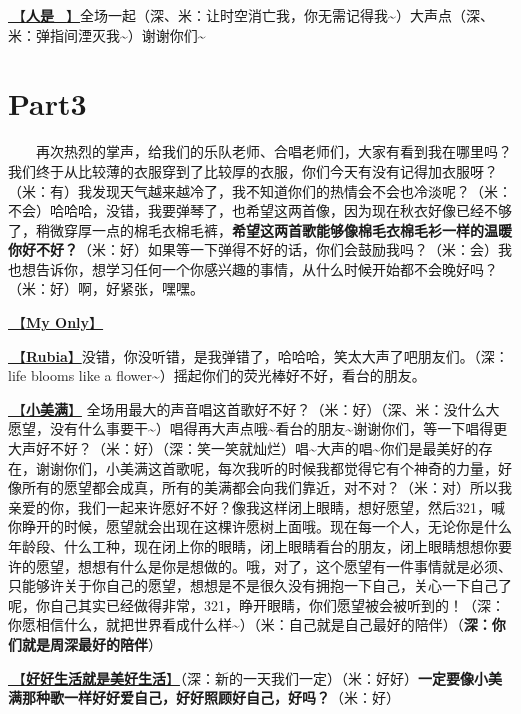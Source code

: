\documentclass[]{ctexbook}
\begin{document}
\hyperref[renshi]{🎵【\textbf{人是\_}】}全场一起（深、米：让时空消亡我，你无需记得我\textasciitilde）大声点（深、米：弹指间湮灭我\textasciitilde）谢谢你们\textasciitilde{}

\section{Part3}\label{suzhou-20241109-part3}

  再次热烈的掌声，给我们的乐队老师、合唱老师们，大家有看到我在哪里吗？我们终于从比较薄的衣服穿到了比较厚的衣服，你们今天有没有记得加衣服呀？（米：有）我发现天气越来越冷了，我不知道你们的热情会不会也冷淡呢？（米：不会）哈哈哈，没错，我要弹琴了，也希望这两首像，因为现在秋衣好像已经不够了，稍微穿厚一点的棉毛衣棉毛裤，\textbf{希望这两首歌能够像棉毛衣棉毛衫一样的温暖你好不好？}（米：好）如果等一下弹得不好的话，你们会鼓励我吗？（米：会）我也想告诉你，想学习任何一个你感兴趣的事情，从什么时候开始都不会晚好吗？（米：好）啊，好紧张，嘿嘿。

\hyperref[my-only]{🎵【\textbf{My Only}】}

\hyperref[rubia]{🎵【\textbf{Rubia}】}没错，你没听错，是我弹错了，哈哈哈，笑太大声了吧朋友们。（深：life blooms like a flower\textasciitilde）摇起你们的荧光棒好不好，看台的朋友。

\hyperref[happy-ending]{🎵【\textbf{小美满}】} 全场用最大的声音唱这首歌好不好？（米：好）（深、米：没什么大愿望，没有什么事要干\textasciitilde）唱得再大声点哦\textasciitilde 看台的朋友\textasciitilde 谢谢你们，等一下唱得更大声好不好？（米：好）（深：笑一笑就灿烂）唱\textasciitilde 大声的唱\textasciitilde 你们是最美好的存在，谢谢你们，小美满这首歌呢，每次我听的时候我都觉得它有个神奇的力量，好像所有的愿望都会成真，所有的美满都会向我们靠近，对不对？（米：对）所以我亲爱的你，我们一起来许愿好不好？像我这样闭上眼睛，想好愿望，然后321，喊你睁开的时候，愿望就会出现在这棵许愿树上面哦。现在每一个人，无论你是什么年龄段、什么工种，现在闭上你的眼睛，闭上眼睛看台的朋友，闭上眼睛想想你要许的愿望，想想有什么是你是想做的。哦，对了，这个愿望有一件事情就是必须、只能够许关于你自己的愿望，想想是不是很久没有拥抱一下自己，关心一下自己了呢，你自己其实已经做得非常，321，睁开眼睛，你们愿望被会被听到的！（深：你愿相信什么，就把世界看成什么样\textasciitilde）（米：自己就是自己最好的陪伴）（\textbf{深：你们就是周深最好的陪伴}）

\hyperref[live-happy-life-happy]{🎵【\textbf{好好生活就是美好生活}】}（深：新的一天我们一定）（米：好好）\textbf{一定要像小美满那种歌一样好好爱自己，好好照顾好自己，好吗？}（米：好）
\end{document}
